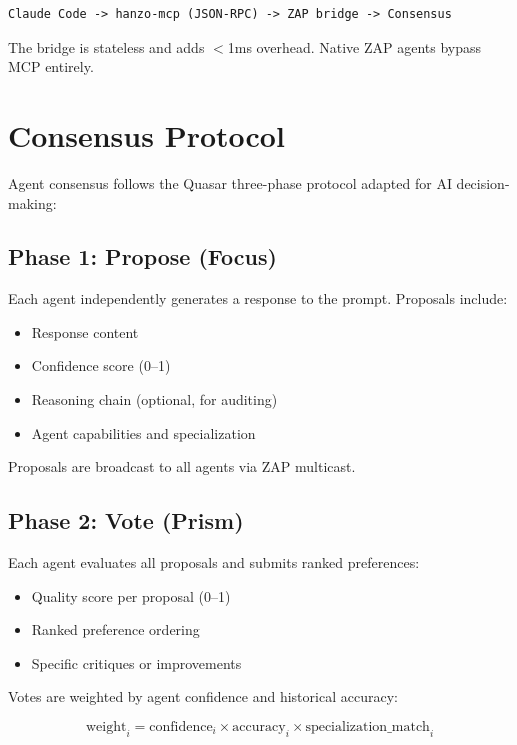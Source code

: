\documentclass[11pt,a4paper]{article}
\begin{document}
\begin{verbatim}
Claude Code -> hanzo-mcp (JSON-RPC) -> ZAP bridge -> Consensus
\end{verbatim}

The bridge is stateless and adds $<$1ms overhead. Native ZAP agents bypass MCP entirely.

\section{Consensus Protocol}

Agent consensus follows the Quasar three-phase protocol adapted for AI decision-making:

\subsection{Phase 1: Propose (Focus)}

Each agent independently generates a response to the prompt. Proposals include:

\begin{itemize}[leftmargin=2em]
\item Response content
\item Confidence score (0--1)
\item Reasoning chain (optional, for auditing)
\item Agent capabilities and specialization
\end{itemize}

Proposals are broadcast to all agents via ZAP multicast.

\subsection{Phase 2: Vote (Prism)}

Each agent evaluates all proposals and submits ranked preferences:

\begin{itemize}[leftmargin=2em]
\item Quality score per proposal (0--1)
\item Ranked preference ordering
\item Specific critiques or improvements
\end{itemize}

Votes are weighted by agent confidence and historical accuracy:

$$\text{weight}_i = \text{confidence}_i \times \text{accuracy}_i \times \text{specialization\_match}_i$$
\end{document}
